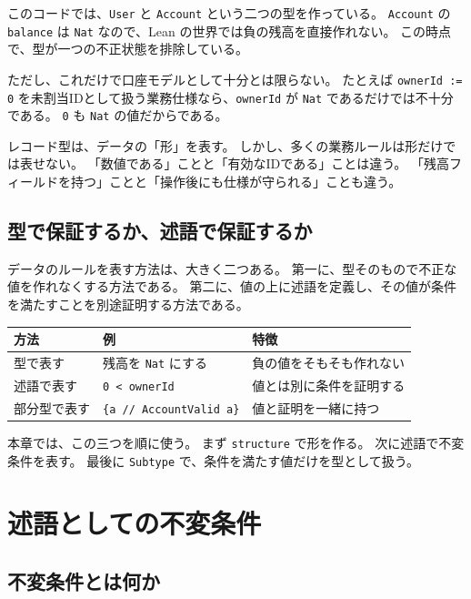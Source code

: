 このコードでは、\texttt{User} と \texttt{Account} という二つの型を作っている。
\texttt{Account} の \texttt{balance} は \texttt{Nat} なので、Lean の世界では負の残高を直接作れない。
この時点で、型が一つの不正状態を排除している。

ただし、これだけで口座モデルとして十分とは限らない。
たとえば \texttt{ownerId := 0} を未割当IDとして扱う業務仕様なら、\texttt{ownerId} が \texttt{Nat} であるだけでは不十分である。
\texttt{0} も \texttt{Nat} の値だからである。

\begin{softwarebox}
レコード型は、データの「形」を表す。
しかし、多くの業務ルールは形だけでは表せない。
「数値である」ことと「有効なIDである」ことは違う。
「残高フィールドを持つ」ことと「操作後にも仕様が守られる」ことも違う。
\end{softwarebox}

\subsection{型で保証するか、述語で保証するか}

データのルールを表す方法は、大きく二つある。
第一に、型そのもので不正な値を作れなくする方法である。
第二に、値の上に述語を定義し、その値が条件を満たすことを別途証明する方法である。

\begin{center}
\begin{tabular}{lll}
\toprule
方法 & 例 & 特徴 \\
\midrule
型で表す & 残高を \texttt{Nat} にする & 負の値をそもそも作れない \\
述語で表す & \texttt{0 < ownerId} & 値とは別に条件を証明する \\
部分型で表す & \texttt{\{a // AccountValid a\}} & 値と証明を一緒に持つ \\
\bottomrule
\end{tabular}
\end{center}

本章では、この三つを順に使う。
まず \texttt{structure} で形を作る。
次に述語で不変条件を表す。
最後に \texttt{Subtype} で、条件を満たす値だけを型として扱う。

\section{述語としての不変条件}

\subsection{不変条件とは何か}

